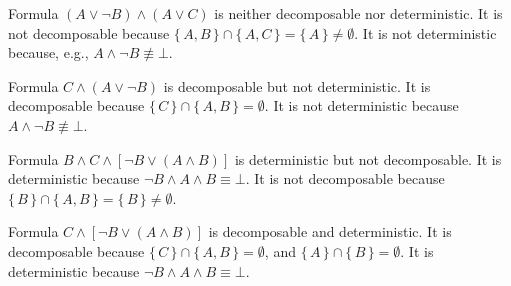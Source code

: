 \begin{example}
  Formula $(A \lor \neg B) \land (A \lor C)$ is neither decomposable nor deterministic. It is not decomposable because $\{\, A, B \,\} \cap \{\, A, C \,\} = \{\, A \,\} \ne \emptyset$. It is not deterministic because, e.g., $A \land \neg B \not\equiv \bot$.
\end{example}

\begin{example} \label{example:ddnnf1}
  Formula $C \land (A \lor \neg B)$ is decomposable but not deterministic. It is decomposable because $\{\, C \,\} \cap \{\, A, B \,\} = \emptyset$. It is not deterministic because $A \land \neg B \not\equiv \bot$.
\end{example}

\begin{example}
  Formula $B \land C \land [\neg B \lor (A \land B)]$ is deterministic but not decomposable. It is deterministic because $\neg B \land A \land B \equiv \bot$. It is not decomposable because $\{\, B \,\} \cap \{\, A, B \,\} = \{\, B \,\} \ne \emptyset$.
\end{example}

\begin{example} \label{example:ddnnf2}
  Formula $C \land [\neg B \lor (A \land B)]$ is decomposable and deterministic. It is decomposable because $\{\, C \,\} \cap \{\, A, B \,\} = \emptyset$, and $\{\, A \,\} \cap \{\, B \,\} = \emptyset$. It is deterministic because $\neg B \land A \land B \equiv \bot$.
\end{example}

